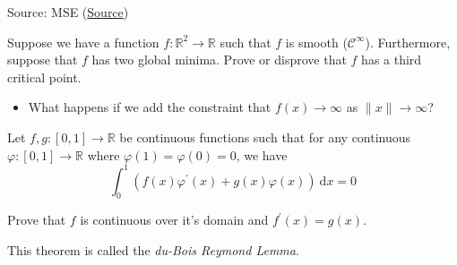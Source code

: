 \documentclass[letterpaper,twoside]{article}
\newcounter{ex}
\begin{document}
\begin{que}
		Source: MSE (\href{https://math.stackexchange.com/questions/4024737/if-a-two-variable-smooth-function-has-two-global-minima-will-it-necessarily-hav}{Source})

Suppose we have a function $f\colon\mathbb{R}^2\to\mathbb{R}$ such that $f$ is smooth ($\mathcal C^\infty$). Furthermore, suppose that $f$ has two global minima. Prove or disprove that $f$ has a third critical point. 
		\begin{itemize}
		\item What happens if we add the constraint that $f(x)\to\infty$ as $\|x\|\to\infty$?  
\end{itemize}	
\end{que}	

\begin{que}
Let $f,g\colon [0,1]\to \mathbb R$ be continuous functions such that for any continuous $\varphi\colon [0,1] \to \mathbb R$ where $\varphi(1)=\varphi(0)=0$, we have \[\int_0^1(f(x)\varphi^\prime(x) + g(x)\varphi(x))\:\mathrm dx=0\]

Prove that $f$ is continuous over it's domain and $f^\prime(x) = g(x)$.

This theorem is called the \emph{du-Bois Reymond Lemma}.
\end{que}	
\end{document}

